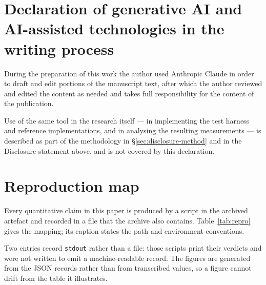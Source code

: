 \documentclass[review,12pt]{elsarticle}
\begin{document}
\section*{Declaration of generative AI and AI-assisted technologies in the
writing process}

During the preparation of this work the author used Anthropic Claude in order
to draft and edit portions of the manuscript text, after which the author
reviewed and edited the content as needed and takes full responsibility for
the content of the publication.

Use of the same tool in the research itself --- in implementing the test harness
and reference implementations, and in analysing the resulting measurements ---
is described as part of the methodology in \S\ref{sec:disclosure-method} and in
the Disclosure statement above, and is not covered by this declaration.

\appendix
\setcounter{table}{0}
\setcounter{figure}{0}
\section{Reproduction map}\label{app:repro}

Every quantitative claim in this paper is produced by a script in the archived
artefact and recorded in a file that the archive also contains. Table~\ref{tab:repro}
gives the mapping; its caption states the path and environment conventions.

Two entries record \texttt{stdout} rather than a file: those scripts print their
verdicts and were not written to emit a machine-readable record. The figures
are generated from the JSON records rather than from transcribed values, so a
figure cannot drift from the table it illustrates.
\end{document}
